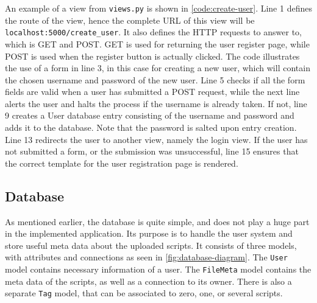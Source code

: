 \noindent An example of a view from \texttt{views.py} is shown in  \autoref{code:create-user}. Line 1 defines the route of the view, hence the complete URL of this view will be \texttt{localhost:5000/create\_user}. It also defines the HTTP requests to answer to, which is GET and POST. GET is used for returning the user register page, while POST is used when the register button is actually clicked. The code illustrates the use of a form in line 3, in this case for creating a new user, which will contain the chosen username and password of the new user. Line 5 checks if all the form fields are valid when a user has submitted a POST request, while the next line alerts the user and halts the process if the username is already taken. If not, line 9 creates a User database entry consisting of the username and password and adds it to the database. Note that the password is salted upon entry creation. Line 13 redirects the user to another view, namely the login view. If the user has not submitted a form, or the submission was unsuccessful, line 15 ensures that the correct template for the user registration page is rendered. \\


\subsection{Database} \label{sec:database}

As mentioned earlier, the database is quite simple, and does not play a huge part in the implemented application. Its purpose is to handle the user system and store useful meta data about the uploaded scripts. It consists of three models, with attributes and connections as seen in \autoref{fig:database-diagram}. The \texttt{User} model contains necessary information of a user. The \texttt{FileMeta} model contains the meta data of the scripts, as well as a connection to its owner. There is also a separate \texttt{Tag} model, that can be associated to zero, one, or several scripts.


